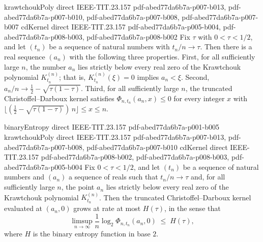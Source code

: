 \begin{theorem}
\label{smallest_zero_asymptotic}
\proofstep
  {krawtchoukPoly}
  {direct}
  {IEEE-TIT.23.157}
  {pdf-abed77da6b7a-p007-b013,
    pdf-abed77da6b7a-p007-b010,
    pdf-abed77da6b7a-p007-b008,
    pdf-abed77da6b7a-p007-b007}
\proofstep
  {cdKernel}
  {direct}
  {IEEE-TIT.23.157}
  {pdf-abed77da6b7a-p005-b004,
    pdf-abed77da6b7a-p008-b003,
    pdf-abed77da6b7a-p008-b002}
Fix $\tau$ with $0 < \tau < 1/2$, and let $(t_n)$ be a sequence of natural numbers with
$t_n/n \to \tau$. Then there is a real sequence $(a_n)$ with the following three
properties. First, for all sufficiently large $n$, the number $a_n$ lies strictly below
every real zero of the Krawtchouk polynomial $K_{t_n}^{(n)}$; that is,
$K_{t_n}^{(n)}(\xi) = 0$ implies $a_n < \xi$. Second, $a_n/n \to \tfrac12 -
\sqrt{\tau(1-\tau)}$. Third, for all sufficiently large $n$, the truncated
Christoffel--Darboux kernel satisfies $\Phi_{n,t_n}(a_n, x) \le 0$ for every integer $x$
with $\big\lfloor (\tfrac12 - \sqrt{\tau(1-\tau)})\,n \big\rfloor \le x \le n$.
\end{theorem}

\begin{theorem}
\label{entropy_growth_of_objective}
\proofstep
  {binaryEntropy}
  {direct}
  {IEEE-TIT.23.157}
  {pdf-abed77da6b7a-p001-b005}
\proofstep
  {krawtchoukPoly}
  {direct}
  {IEEE-TIT.23.157}
  {pdf-abed77da6b7a-p007-b013,
    pdf-abed77da6b7a-p007-b008,
    pdf-abed77da6b7a-p007-b010}
\proofstep
  {cdKernel}
  {direct}
  {IEEE-TIT.23.157}
  {pdf-abed77da6b7a-p008-b002,
    pdf-abed77da6b7a-p008-b003,
    pdf-abed77da6b7a-p005-b004}
Fix $0 < \tau < 1/2$, and let $(t_n)$ be a sequence of natural numbers and $(a_n)$ a
sequence of reals such that $t_n/n \to \tau$ and, for all sufficiently large $n$, the
point $a_n$ lies strictly below every real zero of the Krawtchouk polynomial
$K_{t_n}^{(n)}$. Then the truncated Christoffel--Darboux kernel evaluated at $(a_n, 0)$
grows at rate at most $H(\tau)$, in the sense that
\[
  \limsup_{n\to\infty} \frac{1}{n}\log_2 \Phi_{n,t_n}(a_n, 0) \;\le\; H(\tau),
\]
where $H$ is the binary entropy function in base $2$.
\end{theorem}

